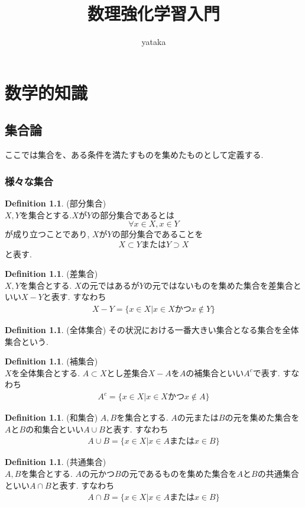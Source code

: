 \documentclass[11pt, a4paper, dvipdfmx]{jsbook}
\title{数理強化学習入門}
\author{yataka}
\date{}
\theoremstyle{definition}
\newtheorem{Definition+}[Axiom+]{Definition}
\begin{document}
\maketitle
\tableofcontents
\part{数学的知識}
\chapter{集合論}
ここでは集合を、ある条件を満たすものを集めたものとして定義する.
\section{様々な集合}
\begin{Definition+}(部分集合)\\
  $X, Y$を集合とする.$X$が$Y$の部分集合であるとは
  \begin{equation*}
    \forall x \in X, x \in Y
  \end{equation*}
  が成り立つことであり, $X$が$Y$の部分集合であることを
  \begin{equation*}
    X\subset Y またはY \supset X
  \end{equation*}
  と表す.
\end{Definition+}
\begin{Definition+}(差集合)\\
  $X, Y$を集合とする. $X$の元ではあるが$Y$の元ではないものを集めた集合を差集合といい$X-Y$と表す. すなわち
  \begin{align*}
    X - Y = \{x\in X| x\in X かつx\notin Y\}
  \end{align*} 
\end{Definition+}
\begin{Definition+}(全体集合)
  その状況における一番大きい集合となる集合を全体集合という.
\end{Definition+}
\begin{Definition+}(補集合)\\
  $X$を全体集合とする. $A\subset X$とし差集合$X - A$を$A$の補集合といい$A^{c}$で表す. すなわち
  \begin{align*}
    A^{c} = \{x\in X| x\in X かつx\notin A\}
  \end{align*} 
\end{Definition+}
\begin{Definition+}(和集合)
  $A, B$を集合とする. $A$の元または$B$の元を集めた集合を$A$と$B$の和集合といい$A\cup B$と表す. すなわち
  \begin{align*}
    A\cup B = \{x\in X| x\in A またはx\in B\}
  \end{align*}
\end{Definition+}
\begin{Definition+}(共通集合)\\
  $A, B$を集合とする. $A$の元かつ$B$の元であるものを集めた集合を$A$と$B$の共通集合といい$A\cap B$と表す. すなわち
  \begin{align*}
    A\cap B = \{x\in X| x\in A またはx\in B\}
  \end{align*}
\end{Definition+}
\end{document}
